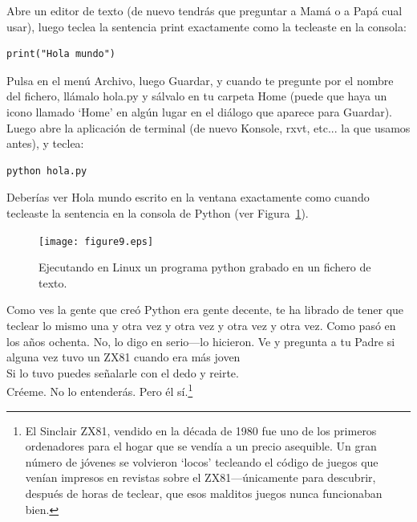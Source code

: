 \begin{LINUX}
Abre un editor de texto (de nuevo tendrás que preguntar a Mamá o a Papá cual usar), luego teclea la sentencia print exactamente como la tecleaste en la consola:

\begin{listing}
\begin{verbatim}
print("Hola mundo")
\end{verbatim}
\end{listing}

Pulsa en el menú Archivo, luego Guardar, y cuando te pregunte por el nombre del fichero, llámalo hola.py y sálvalo en tu carpeta Home (puede que haya un icono llamado `Home' en algún lugar en el diálogo que aparece para Guardar). Luego abre la aplicación de terminal (de nuevo Konsole, rxvt, etc... la que usamos antes), y teclea:

\begin{listing}
\begin{verbatim}
python hola.py
\end{verbatim}
\end{listing}

Deberías ver Hola mundo escrito en la ventana exactamente como cuando tecleaste la sentencia en la consola de Python (ver Figura~\ref{fig9}).

\begin{figure}
\begin{center}
\texttt{[image: figure9.eps]}
\end{center}
\caption{Ejecutando en Linux un programa python grabado en un fichero de texto.}\label{fig9}
\end{figure}
\end{LINUX}

Como ves la gente que creó Python era gente decente, te ha librado de tener que teclear lo mismo una y otra vez y otra vez y otra vez y otra vez. Como pasó en los años ochenta. No, lo digo en serio---lo hicieron. Ve y pregunta a tu Padre si alguna vez tuvo un ZX81 cuando era más joven\\

\noindent
Si lo tuvo puedes señalarle con el dedo y reirte.\\

\noindent
Créeme. No lo entenderás. Pero él sí.\footnote{El Sinclair ZX81, vendido en la década de 1980 fue uno de los primeros ordenadores para el hogar que se vendía a un precio asequible. Un gran número de jóvenes se volvieron `locos' tecleando el código de juegos que venían impresos en revistas sobre el ZX81---únicamente para descubrir, después de horas de teclear, que esos malditos juegos nunca funcionaban bien.}

